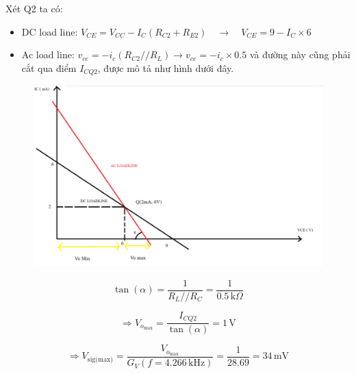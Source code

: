 
Xét Q2 ta có:
\begin{itemize}[label=-]
	\item DC load line: $V_{CE} = V_{CC} - I_{C}(R_{C2} + R_{E2}) \quad \rightarrow \quad V_{CE} = 9 - I_{C} \times 6$
	\item Ac load line: $v_{ce} = -i_{c} ( R_{C2} // R_{L})  →  v_{ce} = -i_{c} \times 0.5$   và đường này cũng phải cắt qua điểm $I_{CQ2}$, được mô tả như hình dưới đây.
\end{itemize}

\begin{figure}[H]
	\centering
	\includegraphics[width=.8\linewidth]{./my-chapters/my-images/Question10/c_hinh.png}
\end{figure}

\[
\tan(\alpha) = \frac{1}{R_L // R_C}
= \frac{1}{0.5\,\text{k}\Omega}
\]

\[
\Rightarrow V_{o_{\text{max}}}
= \frac{I_{CQ2}}{\tan(\alpha)}
= 1\,\text{V}
\]

\[
\Rightarrow V_{\text{sig(max)}}
= \frac{V_{o_{\text{max}}}}{G_V(f = 4.266\,\text{kHz})}
= \frac{1}{28.69}
= 34\,\text{mV}
\]

